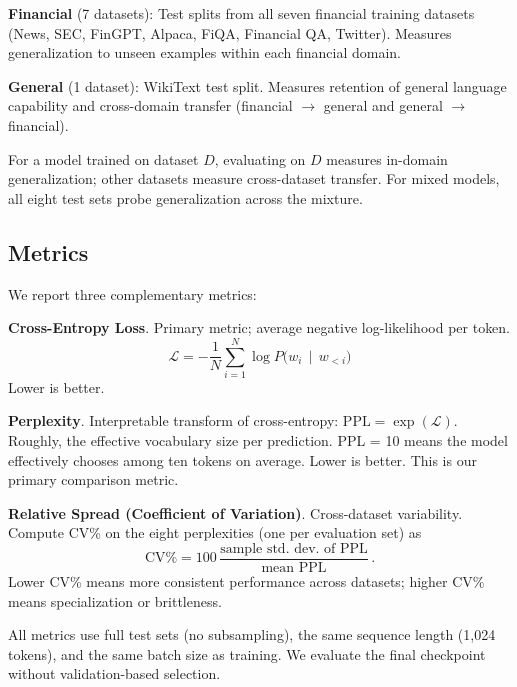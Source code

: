 \textbf{Financial} (7 datasets): Test splits from all seven financial training datasets (News, SEC, FinGPT, Alpaca, FiQA, Financial QA, Twitter). Measures generalization to unseen examples within each financial domain.

\textbf{General} (1 dataset): WikiText test split. Measures retention of general language capability and cross-domain transfer (financial $\to$ general and general $\to$ financial).

For a model trained on dataset $D$, evaluating on $D$ measures in-domain generalization; other datasets measure cross-dataset transfer. For mixed models, all eight test sets probe generalization across the mixture.

\subsection{Metrics}

We report three complementary metrics:

\textbf{Cross-Entropy Loss}. Primary metric; average negative log-likelihood per token.
\begin{equation*}
    \mathcal{L} = -\frac{1}{N}\sum_{i=1}^{N} \log P\bigl(w_i \,\mid\, w_{<i}\bigr)
\end{equation*}
Lower is better.

\textbf{Perplexity}. Interpretable transform of cross-entropy: $\text{PPL} = \exp(\mathcal{L})$. Roughly, the effective vocabulary size per prediction. PPL = 10 means the model effectively chooses among ten tokens on average. Lower is better. This is our primary comparison metric.

\textbf{Relative Spread (Coefficient of Variation)}. Cross-dataset variability. Compute CV\% on the eight perplexities (one per evaluation set) as
\begin{equation*}
    \text{CV}\% = 100\,\frac{\text{sample std. dev. of PPL}}{\text{mean PPL}}\, .
\end{equation*}
Lower CV\% means more consistent performance across datasets; higher CV\% means specialization or brittleness.

All metrics use full test sets (no subsampling), the same sequence length (1,024 tokens), and the same batch size as training. We evaluate the final checkpoint without validation-based selection.

